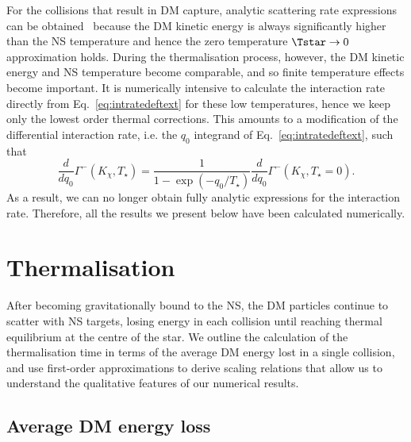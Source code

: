 For the collisions that result in DM capture, analytic scattering rate expressions can be obtained~\cite{Bell:2020jou_sep_ImprovedTreatmentDark,Bell:2020lmm_mar_ImprovedTreatmentDark} because the DM kinetic energy is always significantly higher than the NS temperature and hence the zero temperature $\Tstar\rightarrow0$ approximation holds. 
During the thermalisation process, however, the DM kinetic energy and NS temperature become comparable, and so finite temperature effects become important. 
It is numerically intensive to calculate the interaction rate directly from Eq.~\ref{eq:intratedeftext} for these low temperatures, hence we keep only the lowest order thermal corrections.
This amounts to a modification of the differential interaction rate, i.e. the $q_0$ integrand of Eq.~\ref{eq:intratedeftext}, such that
\begin{equation}
    \frac{d }{d q_0}\Gamma^-(K_\chi, T_\star) = \frac{1}{1 - \exp(-q_0/T_\star)} \frac{d }{d q_0}\Gamma^-(K_\chi, T_\star = 0).
    \label{eq:diffGammaFiniteTemp}
  \end{equation}
  As a result, we can no longer obtain fully analytic expressions for the interaction rate. Therefore, all the results we present below have been calculated numerically. 
  
  
\section{Thermalisation}
\label{sec:thermalisation}



After becoming gravitationally bound to the NS, the DM particles continue to scatter with NS targets, losing energy in each collision until reaching thermal equilibrium at the centre of the star. 
We outline the calculation of the thermalisation time in terms of the average DM energy lost in a single collision, and use first-order approximations to derive scaling relations that allow us to understand the qualitative features of our numerical results.


\subsection{Average DM energy loss}
\label{sec:energyloss}


